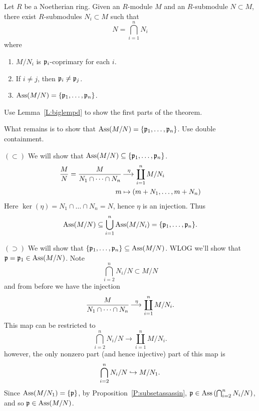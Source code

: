 \documentclass{ximera}
\begin{document}
\begin{theorem}
  Let $R$ be a Noetherian ring. Given an $R$-module $M$ and an
  $R$-submodule $N\subset M$, there exist $R$-submodules $N_i\subset
  M$ such that
  \[
  N = \bigcap_{i=1}^n N_i
  \]
  where
  \begin{enumerate}
  \item $M/N_i$ is $\mathfrak{p}_i$-coprimary for each $i$.
  \item If $i\ne j$, then $\mathfrak{p}_i\ne\mathfrak{p}_j$.
  \item $\operatorname{Ass}(M/N) = \{\mathfrak{p}_1,\dots,\mathfrak{p}_n\}$.
  \end{enumerate}
  \begin{sketch}
    Use Lemma~\ref{L:biglempd} to show the first parts of the theorem.
    
    What remains is to show that $\operatorname{Ass}(M/N) =
    \{\mathfrak{p}_1,\dots,\mathfrak{p}_n\}$. Use double containment.
    
    $(\subset)$ We will show that $\operatorname{Ass}(M/N)
    \subseteq\{\mathfrak{p}_1,\dots,\mathfrak{p}_n\}$.
    \begin{align*}
      \frac{M}{N} = \frac{M}{N_1\cap\dots\cap N_n} &\mathop{\longrightarrow\,}\limits^\eta \coprod_{i=1}^n M/N_i\\
        m &\mapsto (m + N_1,\dots, m+ N_n)
    \end{align*}
    Here $\ker(\eta) = N_1\cap\dots\cap N_n = N$, hence $\eta$ is an
    injection. Thus
    \[
    \operatorname{Ass}(M/N) \subseteq \bigcup_{i=1}^n \operatorname{Ass}(M/N_i) = \{\mathfrak{p}_1,\dots,\mathfrak{p}_n\}.
    \]


    $(\supset)$ We will show that $\{\mathfrak{p}_1,\dots,\mathfrak{p}_n\} \subseteq
    \operatorname{Ass}(M/N)$. WLOG we'll show that $\mathfrak{p}=\mathfrak{p}_1\in\operatorname{Ass}(M/N)$. Note
    \[
    \bigcap_{i=2}^n N_i/N \subset M/N
    \]
    and from before we have the injection
    \[
    \frac{M}{N_1\cap\dots\cap N_n} \mathop{\longrightarrow\,}\limits^\eta \coprod_{i=1}^n M/N_i.
    \]
    This map can be restricted to
    \[
    \bigcap_{i=2}^n N_i/N \to \coprod_{i=1}^n M/N_i.
    \]
    however, the only nonzero part (and hence injective) part of this
    map is
    \[
    \bigcap_{i=2}^n N_i/N \hookrightarrow M/N_1.
    \]
    Since $\operatorname{Ass}(M/N_1) = \{\mathfrak{p}\}$, by Proposition~\ref{P:subsetassassin},
    $\mathfrak{p}\in\operatorname{Ass}\left(\bigcap_{i=2}^n N_i/N\right)$, and so
    $\mathfrak{p}\in\operatorname{Ass}(M/N)$.
  \end{sketch}
\end{theorem}
\end{document}
